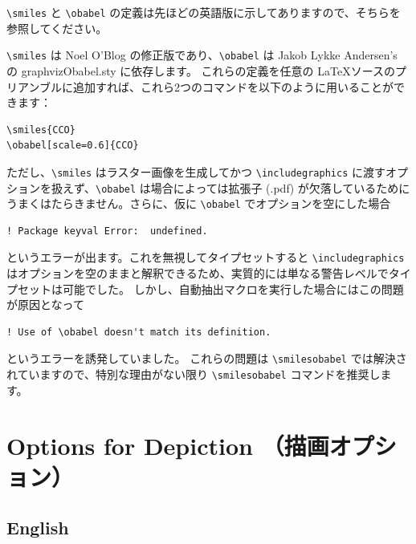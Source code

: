 \documentclass[12pt]{jsarticle}
\begin{document}
\verb|\smiles| と \verb|\obabel| の定義は先ほどの英語版に示してありますので、そちらを参照してください。

\verb|\smiles| は Noel O'Blog \cite{NOB1} の修正版であり、\verb|\obabel| は Jakob Lykke Andersen's \cite{JLA} の \textsf{graphvizObabel.sty} に依存します。
これらの定義を任意の \LaTeX ソースのプリアンブルに追加すれば、これら2つのコマンドを以下のように用いることができます：
\begin{verbatim}
\smiles{CCO}
\obabel[scale=0.6]{CCO}
\end{verbatim}
ただし、\verb|\smiles| はラスター画像を生成してかつ \verb|\includegraphics| に渡すオプションを扱えず、\verb|\obabel| は場合によっては拡張子 (.pdf) が欠落しているためにうまくはたらきません。さらに、仮に \verb|\obabel| でオプションを空にした場合
\begin{verbatim}
! Package keyval Error:  undefined.
\end{verbatim}
というエラーが出ます。これを無視してタイプセットすると \verb|\includegraphics| はオプションを空のままと解釈できるため、実質的には単なる警告レベルでタイプセットは可能でした。
しかし、自動抽出マクロを実行した場合にはこの問題が原因となって
\begin{verbatim}
! Use of \obabel doesn't match its definition.
\end{verbatim}
というエラーを誘発していました。
これらの問題は \verb|\smilesobabel| では解決されていますので、特別な理由がない限り \verb|\smilesobabel| コマンドを推奨します。

\clearpage

\section{Options for Depiction （描画オプション）} \label{depict}

\subsection{English}
\end{document}

